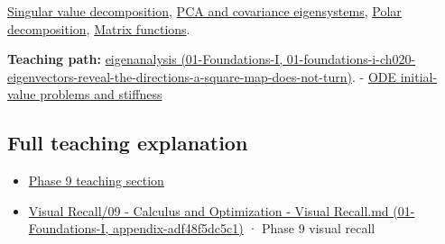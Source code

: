 \hyperref[appendix-1fad5e7f36fa]{Singular value decomposition}, \hyperref[appendix-ad175ef3c5bf]{PCA and covariance eigensystems}, \hyperref[appendix-73f5bcf7a462]{Polar decomposition}, \hyperref[appendix-0f4bc2bf2b1f]{Matrix functions}.

\textbf{Teaching path:} \href{../01-Foundations-I/main.pdf\#nameddest=01-foundations-i-ch020-eigenvectors-reveal-the-directions-a-square-map-does-not-turn}{eigenanalysis (01-Foundations-I, 01-foundations-i-ch020-eigenvectors-reveal-the-directions-a-square-map-does-not-turn)}. - \hyperref[appendix-e8ab9836882e]{ODE initial-value problems and stiffness}

\subsection{Full teaching explanation}\label{appendix-0b3be18411f9-full-teaching-explanation}

\begin{itemize}
\tightlist
\item
  \hyperref[02-foundations-ii-ch025-odes-and-numerical-simulation]{Phase 9 teaching section}
\item
  \href{../01-Foundations-I/main.pdf\#nameddest=appendix-adf48f5dc5c1}{Visual Recall/09 - Calculus and Optimization - Visual Recall.md (01-Foundations-I, appendix-adf48f5dc5c1)} · Phase 9 visual recall
\end{itemize}
